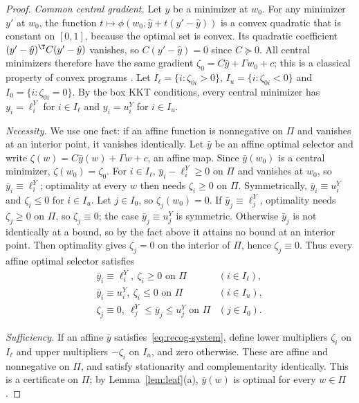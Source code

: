 \begin{proof}
\emph{Common central gradient.} Let $\hat y$ be a minimizer at $w_0$. For
any minimizer $y'$ at $w_0$, the function
$t\mapsto\phi(w_0,\hat y+t(y'-\hat y))$ is a convex quadratic that is
constant on $[0,1]$, because the optimal set is convex. Its quadratic
coefficient $(y'-\hat y)^{\T}C(y'-\hat y)$ vanishes, so $C(y'-\hat y)=0$
since $C\succeq0$. All central minimizers therefore have the same gradient
$\zeta_0=C\hat y+\Gamma w_0+c$; this is a classical property of convex
programs \cite{Mangasarian1988}. Let $I_\ell=\{i:\zeta_{0i}>0\}$,
$I_u=\{i:\zeta_{0i}<0\}$ and $I_0=\{i:\zeta_{0i}=0\}$. By the box KKT
conditions, every central minimizer has $y_i=\ell^Y_i$ for $i\in I_\ell$ and
$y_i=u^Y_i$ for $i\in I_u$.

\emph{Necessity.} We use one fact: if an affine function is nonnegative on
$\Pi$ and vanishes at an interior point, it vanishes identically. Let $\bar y$
be an affine optimal selector and write $\zeta(w)=C\bar y(w)+\Gamma w+c$, an
affine map. Since $\bar y(w_0)$ is a central minimizer, $\zeta(w_0)=\zeta_0$.
For $i\in I_\ell$, $\bar y_i-\ell^Y_i\ge0$ on $\Pi$ and vanishes at $w_0$,
so $\bar y_i\equiv\ell^Y_i$; optimality at every $w$ then needs
$\zeta_i\ge0$ on $\Pi$. Symmetrically, $\bar y_i\equiv u^Y_i$ and
$\zeta_i\le0$ for $i\in I_u$. Let $j\in I_0$, so $\zeta_j(w_0)=0$. If
$\bar y_j\equiv\ell^Y_j$, optimality needs $\zeta_j\ge0$ on $\Pi$, so
$\zeta_j\equiv0$; the case $\bar y_j\equiv u^Y_j$ is symmetric. Otherwise
$\bar y_j$ is not identically at a bound, so by the fact above it attains no
bound at an interior point. Then optimality gives $\zeta_j=0$ on the interior
of $\Pi$, hence $\zeta_j\equiv0$. Thus every affine optimal selector
satisfies
\begin{equation}\label{eq:recog-system}
\begin{array}{ll}
\bar y_i\equiv\ell^Y_i,\ \zeta_i\ge0\text{ on }\Pi & (i\in I_\ell),\\
\bar y_i\equiv u^Y_i,\ \zeta_i\le0\text{ on }\Pi & (i\in I_u),\\
\zeta_j\equiv0,\ \ell^Y_j\le\bar y_j\le u^Y_j\text{ on }\Pi & (j\in I_0).
\end{array}
\end{equation}

\emph{Sufficiency.} If an affine $\bar y$ satisfies~\eqref{eq:recog-system},
define lower multipliers $\zeta_i$ on $I_\ell$ and upper multipliers
$-\zeta_i$ on $I_u$, and zero otherwise. These are affine and nonnegative on
$\Pi$, and satisfy stationarity and complementarity identically. This is a
certificate on $\Pi$; by Lemma~\ref{lem:leaf}(a), $\bar y(w)$ is optimal for
every $w\in\Pi$.


\end{proof}
